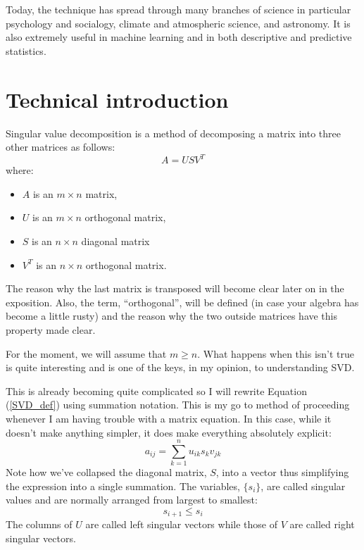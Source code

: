 \documentclass{article}
\begin{document}
Today, the technique has spread through many branches of science in particular
psychology and socialogy, climate and atmospheric science, and astronomy.
It is also extremely useful in machine learning and in both descriptive and
predictive statistics.

\section{Technical introduction}

Singular value decomposition is a method of decomposing a matrix into three
other matrices as follows:
\begin{equation}
A = U S V^T
\label{SVD_def}
\end{equation}
where:
\begin{itemize}
\item $A$ is an $m \times n$ matrix, 
\item $U$ is an $m \times n$ orthogonal matrix,
\item $S$ is an $n \times n$ diagonal matrix
\item $V^T$ is an $n \times n$ orthogonal matrix.
\end{itemize}
The reason why the last matrix is transposed will become clear later on in the
exposition.
Also, the term, ``orthogonal'', will be defined (in case your algebra has become
a little rusty) and the reason why the two outside matrices have this
property made clear.

For the moment, we will assume that $m \ge n$.
What happens when this isn't true is quite interesting and is one of the keys,
in my opinion, to understanding SVD.

This is already becoming quite complicated so I will rewrite Equation 
(\ref{SVD_def}) using summation notation.
This is my go to method of proceeding whenever I am having trouble with a 
matrix equation.
In this case, while it doesn't make anything simpler, it does make everything
absolutely explicit:
\begin{equation}
a_{ij} = \sum_{k=1}^n u_{ik} s_k v_{jk}
\end{equation}
Note how we've collapsed the diagonal matrix, $S$, into a vector thus 
simplifying the expression into a single summation.
The variables, $\lbrace s_i \rbrace$, are called singular values and are normally arranged
from largest to smallest:
\begin{equation}
	s_{i+1} \le s_i
\end{equation}
The columns of $U$ are called left singular vectors while those of $V$ are
called right singular vectors.
\end{document}
